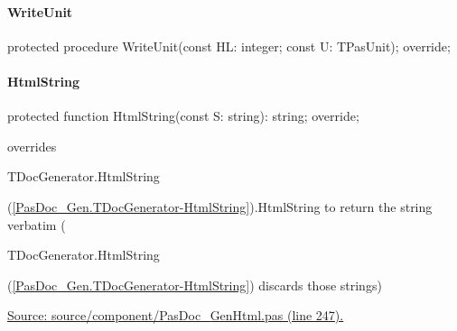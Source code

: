 \documentclass{report}
\newif\ifpdf
\begin{document}
\paragraph*{WriteUnit}\hspace*{\fill}

\label{PasDoc_GenHtml.TGenericHTMLDocGenerator-WriteUnit}
\begin{list}{}{
\setlength{\itemindent}{0cm}
\setlength{\listparindent}{0cm}
\setlength{\leftmargin}{\evensidemargin}
\addtolength{\leftmargin}{\tmplength}
\settowidth{\labelsep}{X}
\addtolength{\leftmargin}{\labelsep}
\setlength{\labelwidth}{\tmplength}
}
\item[\textbf{Declaration}\hfill]
\ifpdf
\begin{flushleft}
\fi
\begin{ttfamily}
protected procedure WriteUnit(const HL: integer; const U: TPasUnit); override;\end{ttfamily}

\ifpdf
\end{flushleft}
\fi

\end{list}
\paragraph*{HtmlString}\hspace*{\fill}

\label{PasDoc_GenHtml.TGenericHTMLDocGenerator-HtmlString}
\begin{list}{}{
\setlength{\itemindent}{0cm}
\setlength{\listparindent}{0cm}
\setlength{\leftmargin}{\evensidemargin}
\addtolength{\leftmargin}{\tmplength}
\settowidth{\labelsep}{X}
\addtolength{\leftmargin}{\labelsep}
\setlength{\labelwidth}{\tmplength}
}
\item[\textbf{Declaration}\hfill]
\ifpdf
\begin{flushleft}
\fi
\begin{ttfamily}
protected function HtmlString(const S: string): string; override;\end{ttfamily}

\ifpdf
\end{flushleft}
\fi

\par
\item[\textbf{Description}]
overrides \begin{ttfamily}TDocGenerator.HtmlString\end{ttfamily}(\ref{PasDoc_Gen.TDocGenerator-HtmlString}).HtmlString to return the string verbatim (\begin{ttfamily}TDocGenerator.HtmlString\end{ttfamily}(\ref{PasDoc_Gen.TDocGenerator-HtmlString}) discards those strings)\par
\href{https://github.com/pasdoc/pasdoc/blob/master/source/component/PasDoc_GenHtml.pas#L247}{Source: source/component/PasDoc{\_}GenHtml.pas (line 247).}

\end{list}
\end{document}
